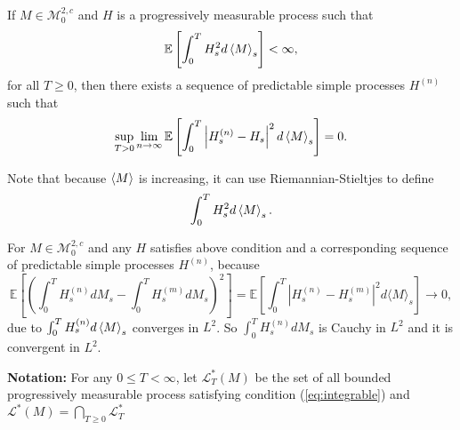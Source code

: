 \begin{thm}
    If $M \in \mathcal{M}^{2,c}_0$ and $H$ is a progressively measurable process such that
    \begin{equation}\label{eq:integrable}
        \mathbb{E}\left[\int_0^T H_s^2 d\left\langle M \right\rangle_s\right] < \infty,
    \end{equation}
    for all $T \geq 0$, then there exists a sequence of predictable simple processes $H^{(n)}$ such that
    \begin{equation*}
        \sup_{T > 0} \lim_{n \rightarrow \infty} \mathbb{E}\left[\int_0^T \left\lvert H_s^{(n)} - H_s\right\lvert^2 d\left\langle M \right\rangle_s\right] = 0.
    \end{equation*}
\end{thm}
\begin{rmk}
    Note that because $\left\langle M \right\rangle$ is increasing, it can use Riemannian-Stieltjes to define
    \begin{equation*}
        \int_0^T H_s^2 d\left\langle M \right\rangle_s.
    \end{equation*}
\end{rmk}
\begin{rmk}
    For $M \in \mathcal{M}^{2,c}_0$ and any $H$ satisfies above condition and a corresponding sequence of predictable simple processes $H^{(n)}$, because
    \begin{equation*}
        \mathbb{E}\left[\left(\int_0^T H_s^{(n)} d M_s-\int_0^T H_s^{(m)} d M_s\right)^2\right] =\mathbb{E}\left[\int_0^T\left|H_s^{(n)}-H_s^{(m)}\right|^2 d\langle M\rangle_s\right] \longrightarrow 0,
    \end{equation*}
    due to $\int_0^TH_s^{(n)} d\left\langle M \right\rangle_s$ converges in $L^2$. So $\int_0^T H_s^{(n)} d M_s$ is Cauchy in $L^2$ and it is convergent in $L^2$.
\end{rmk}

\noindent \textbf{Notation:} For any $0 \leq T < \infty$, let $\mathcal{L}^*_T(M)$ be the set of all bounded progressively measurable process satisfying condition (\ref{eq:integrable}) and $\mathcal{L}^*(M) = \bigcap_{T \geq 0} \mathcal{L}_T^*$

